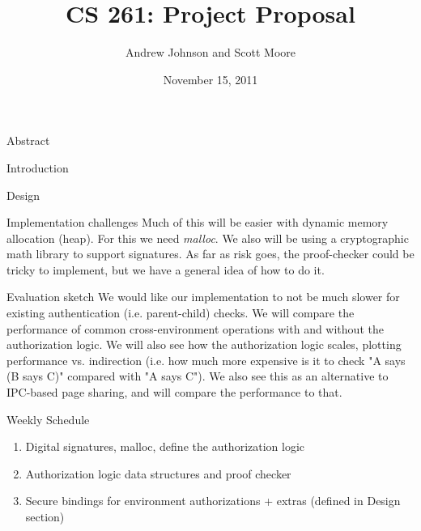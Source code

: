 \documentclass[10pt]{article}
\begin{document}
\title{CS 261: Project Proposal}
\author{Andrew Johnson and Scott Moore}
\date{November 15, 2011}

\maketitle

\thispagestyle{empty}

\begin{comment}

\begin{problem}{Problem Title}
Problem Statement
\newline\newline
\textbf{\emph{Solution}}:
\newline\newline
Solution goes here
\end{problem}

\end{comment}

\begin{section}{Abstract}
\end{section}

\begin{section}{Introduction}
\end{section}

\begin{section}{Design}
\end{section}

\begin{section}{Implementation challenges}
Much of this will be easier with dynamic memory allocation (heap).  
For this we need \emph{malloc}.  
We also will be using a cryptographic math library to support signatures. 
As far as risk goes, the proof-checker could be tricky to implement, but we have a general idea of how to do it.
\end{section}

\begin{section}{Evaluation sketch}
We would like our implementation to not be much slower for existing authentication (i.e. parent-child) checks.  
We will compare the performance of common cross-environment operations with and without the authorization logic.  
We will also see how the authorization logic scales, plotting performance vs. indirection (i.e. how much more expensive is it to check "A says (B says C)" compared with "A says C").
We also see this as an alternative to IPC-based page sharing, and will compare the performance to that.
\end{section}

\begin{section}{Weekly Schedule}
\begin{enumerate}
\item Digital signatures, malloc, define the authorization logic
\item Authorization logic data structures and proof checker
\item Secure bindings for environment authorizations + extras (defined in Design section)
\end{enumerate}
\end{section}
\end{document}
